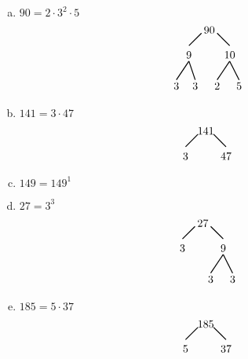 \documentclass[11pt,letterpaper]{article}
\begin{document}
\sol
\begin{enumerate}[(a)]
\item $90= 2 \cdot 3^2 \cdot 5$
	\[
	\begin{tikzpicture}
	\node at (-0.15,0) {$90$};
	\draw[line width=0.03cm] (-0.4,-0.1) -- (-0.8,-0.5);
	\node at (-0.8,-0.8) {$9$};
	\draw[line width=0.03cm]  (0.1,-0.1) -- (0.5,-0.5);
	\node at (0.5,-0.8) {$10$};
		
	\draw[line width=0.03cm] (-0.8,-1) -- (-1.2,-1.6);
	\node at (-1.2,-1.8) {$3$};
	\draw[line width=0.03cm] (-0.8,-1) -- (-0.6,-1.6);
	\node at (-0.6,-1.8) {$3$};
	
	\draw[line width=0.03cm] (0.5,-1) -- (0.1,-1.6);
	\node at (0.1,-1.8) {$2$};
	\draw[line width=0.03cm] (0.5,-1) -- (0.8,-1.6);
	\node at (0.8,-1.8) {$5$};
	\end{tikzpicture}
	\] \pspace

\item $141= 3 \cdot 47$
	\[
	\begin{tikzpicture}
	\node at (-0.15,0) {$141$};
	\draw[line width=0.03cm] (-0.4,-0.1) -- (-0.8,-0.5);
	\node at (-0.8,-0.8) {$3$};
	\draw[line width=0.03cm]  (0.1,-0.1) -- (0.5,-0.5);
	\node at (0.5,-0.8) {$47$};
	\end{tikzpicture}
	\] \pspace

\item $149= 149^1$ \pspace

\item $27= 3^3$
	\[
	\begin{tikzpicture}
	\node at (-0.15,0) {$27$};
	\draw[line width=0.03cm] (-0.4,-0.1) -- (-0.8,-0.5);
	\node at (-0.8,-0.8) {$3$};
	\draw[line width=0.03cm]  (0.1,-0.1) -- (0.5,-0.5);
	\node at (0.5,-0.8) {$9$};
	
	\draw[line width=0.03cm] (0.5,-1) -- (0.1,-1.6);
	\node at (0.1,-1.8) {$3$};
	\draw[line width=0.03cm] (0.5,-1) -- (0.8,-1.6);
	\node at (0.8,-1.8) {$3$};
	\end{tikzpicture}
	\] \pspace

\item $185= 5 \cdot 37$
	\[
	\begin{tikzpicture}
	\node at (-0.15,0) {$185$};
	\draw[line width=0.03cm] (-0.4,-0.1) -- (-0.8,-0.5);
	\node at (-0.8,-0.8) {$5$};
	\draw[line width=0.03cm]  (0.1,-0.1) -- (0.5,-0.5);
	\node at (0.5,-0.8) {$37$};
	\end{tikzpicture}
	\] 
\end{enumerate}
\end{document}
